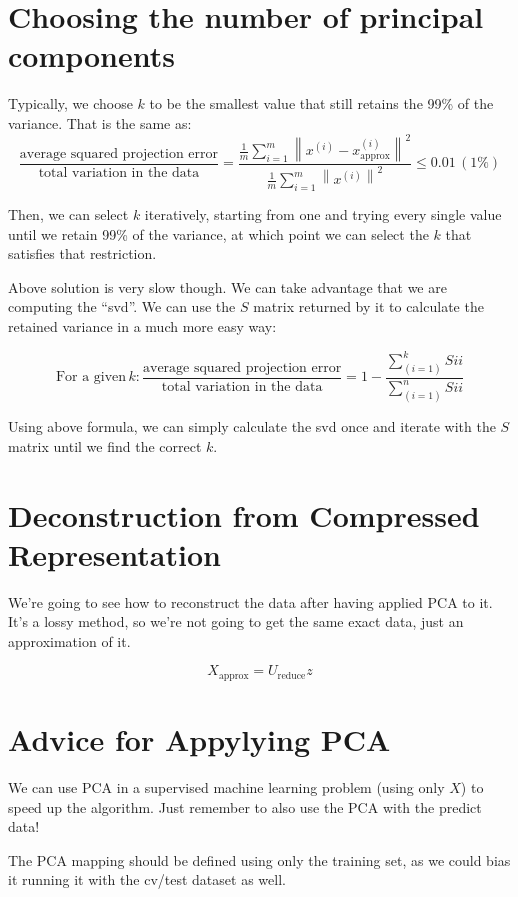 \documentclass[10pt]{extarticle}
\newcommand{\norm}[1]{\left\lVert#1\right\rVert}
\begin{document}
\section{Choosing the number of principal
components}\label{choosing-the-number-of-principal-components}

Typically, we choose $k$ to be the smallest value that still retains the
99\% of the variance. That is the same as: \[
\frac{\text{average squared projection error}}{\text{total variation in the data}} = \frac{\frac{1}{m} \sum_{i=1}^m \norm{x^{(i)} - x_\text{approx}^{(i)}}^2}{\frac{1}{m} \sum_{i=1}^m \norm{x^{(i)}}^2} \leq 0.01 \, (1\%)
\]

Then, we can select $k$ iteratively, starting from one and trying every
single value until we retain 99\% of the variance, at which point we can
select the $k$ that satisfies that restriction. \smallskip

Above solution is very slow though. We can take advantage that we are
computing the ``svd''. We can use the $S$ matrix returned by it to
calculate the retained variance in a much more easy way:

\[
\text{For a given} \, k:
\frac{\text{average squared projection error}}{\text{total variation in the data}} = 1 - \frac{\sum_{(i=1)}^k Sii}{\sum_{(i=1)}^n Sii}
\]

Using above formula, we can simply calculate the svd once and iterate
with the $S$ matrix until we find the correct $k$.

\section{Deconstruction from Compressed
Representation}\label{deconstruction-from-compressed-representation}

We're going to see how to reconstruct the data after having applied PCA
to it. It's a lossy method, so we're not going to get the same exact
data, just an approximation of it.

\[
X_\text{approx} = U_\text{reduce} z
\]

\section{Advice for Appylying PCA}\label{advice-for-appylying-pca}

We can use PCA in a supervised machine learning problem (using only $X$)
to speed up the algorithm. Just remember to also use the PCA with the
predict data! \smallskip

The PCA mapping should be defined using only the training set, as we
could bias it running it with the cv/test dataset as well.




    \nocite{*}



\end{document}
